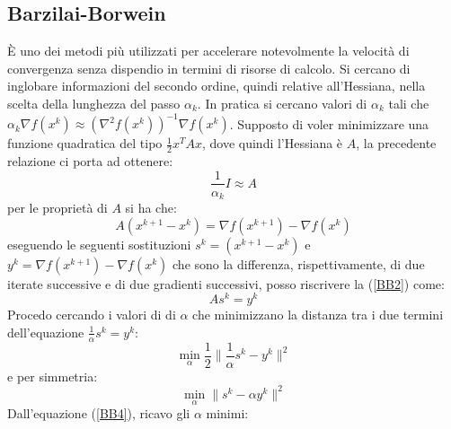 \documentclass{report}
\begin{document}
\subsection{Barzilai-Borwein}
\`E uno dei metodi più utilizzati per accelerare notevolmente la velocità di convergenza senza dispendio in termini di risorse di calcolo. Si cercano di inglobare informazioni del secondo ordine, quindi relative all'Hessiana, nella scelta della lunghezza del passo $\alpha_k$. In pratica si cercano valori di $\alpha_k$ tali che $\alpha_k \nabla f(x^k) \approx (\nabla^2 f(x^k))^{-1}  \nabla f(x^k)$. Supposto di voler minimizzare una funzione quadratica del tipo $\frac{1}{2} x^T A x$, dove quindi l'Hessiana è $A$, la precedente relazione ci porta ad ottenere:
\begin{equation}
    \label{BB1}
        \frac{1}{\alpha_k} I \approx A	
\end{equation}
per le proprietà di $A$ si ha che:
\begin{equation}
    \label{BB2}
        A (x^{k+1} - x^{k}) = \nabla f(x^{k+1}) -\nabla f( x^{k} )
\end{equation}
eseguendo le seguenti sostituzioni $s^k =(x^{k+1} - x^{k})$ e $y^k=\nabla f(x^{k+1}) -\nabla f( x^{k} )$ che sono la differenza, rispettivamente, di due iterate successive e di due gradienti successivi, posso riscrivere la (\ref{BB2}) come:
\begin{equation}
    \label{BB3}
        A s^k = y^k
\end{equation}
Procedo cercando i valori di di $\alpha$ che minimizzano la distanza tra i due termini dell'equazione $\frac{1}{\alpha}  s^k = y^k$:
\begin{equation} 
\label{BB4}
\min_{\alpha} \frac{1}{2} \|\frac{1}{\alpha} s^k - y^k\|^2 
\end{equation}
e per simmetria:
\begin{equation} 
\label{BB5}
\min_{\alpha} \| s^k -\alpha y^k\|^2 
\end{equation}
Dall'equazione (\ref{BB4}), ricavo gli $\alpha$ minimi:
\end{document}
